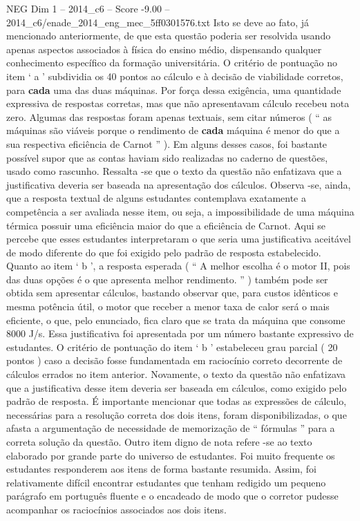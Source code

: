 \begin{textsample}{NEG Dim 1 – 2014\_c6 – Score -9.00 – 2014\_c6/enade\_2014\_eng\_mec\_5ff0301576.txt}
Isto se deve ao fato, já mencionado anteriormente, de que esta questão poderia ser resolvida usando apenas aspectos associados à física do ensino médio, dispensando qualquer conhecimento específico da formação universitária.
O critério de pontuação no item ‘ a ’ subdividia os 40 pontos ao cálculo e à decisão de viabilidade corretos, para \textbf{cada} uma das duas máquinas.
Por força dessa exigência, uma quantidade expressiva de respostas corretas, mas que não apresentavam cálculo recebeu nota zero.
Algumas das respostas foram apenas textuais, sem citar números ( “ as máquinas são viáveis porque o rendimento de \textbf{cada} máquina é menor do que a sua respectiva eficiência de Carnot ” ).
Em alguns desses casos, foi bastante possível supor que as contas haviam sido realizadas no caderno de questões, usado como rascunho.
Ressalta -se que o texto da questão não enfatizava que a justificativa deveria ser baseada na apresentação dos cálculos.
Observa -se, ainda, que a resposta textual de alguns estudantes contemplava exatamente a competência a ser avaliada nesse item, ou seja, a impossibilidade de uma máquina térmica possuir uma eficiência maior do que a eficiência de Carnot.
Aqui se percebe que esses estudantes interpretaram o que seria uma justificativa aceitável de modo diferente do que foi exigido pelo padrão de resposta estabelecido.
Quanto ao item ‘ b ’, a resposta esperada ( “ A melhor escolha é o motor II, pois das duas opções é o que apresenta melhor rendimento. ” ) também pode ser obtida sem apresentar cálculos, bastando observar que, para custos idênticos e mesma potência útil, o motor que receber a menor taxa de calor será o mais eficiente, o que, pelo enunciado, fica claro que se trata da máquina que consome 8000 J/s.
Essa justificativa foi apresentada por um número bastante expressivo de estudantes.
O critério de pontuação do item ‘ b ’ estabeleceu grau parcial ( 20 pontos ) caso a decisão fosse fundamentada em raciocínio correto decorrente de cálculos errados no item anterior.
Novamente, o texto da questão não enfatizava que a justificativa desse item deveria ser baseada em cálculos, como exigido pelo padrão de resposta.
É importante mencionar que todas as expressões de cálculo, necessárias para a resolução correta dos dois itens, foram disponibilizadas, o que afasta a argumentação de necessidade de memorização de “ fórmulas ” para a correta solução da questão.
Outro item digno de nota refere -se ao texto elaborado por grande parte do universo de estudantes.
Foi muito frequente os estudantes responderem aos itens de forma bastante resumida.
Assim, foi relativamente difícil encontrar estudantes que tenham redigido um pequeno parágrafo em português fluente e o encadeado de modo que o corretor pudesse acompanhar os raciocínios associados aos dois itens.

\end{textsample}
